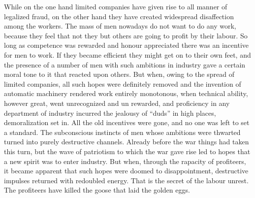 \documentclass{book}
\begin{document}
While on the one hand limited companies have given rise to all manner of legalized fraud, on the other hand they have created widespread disaffection among the workers. The mass of men nowadays do not want to do any work, because they feel that not they but others are going to profit by their labour. So long as competence was rewarded and honour appreciated there was an incentive for men to work. If they became efficient they might get on to their own feet, and the presence of a number of men with such ambitions in industry gave a certain moral tone to it that reacted upon others. But when, owing to the spread of limited companies, all such hopes were definitely removed and the invention of automatic machinery rendered work entirely monotonous, when technical ability, however great, went unrecognized and un rewarded, and proficiency in any department of industry incurred the jealousy of “duds” in high places, demoralization set in. All the old incentives were gone, and no one was left to set a standard. The subconscious instincts of men whose ambitions were thwarted turned into purely destructive channels. Already before the war things had taken this turn, but the wave of patriotism to which the war gave rise led to hopes that a new spirit was to enter industry. But when, through the rapacity of profiteers, it became apparent that such hopes were doomed to disappointment, destructive impulses returned with redoubled energy. That is the secret of the labour unrest. The profiteers have killed the goose that laid the golden eggs.
\end{document}
